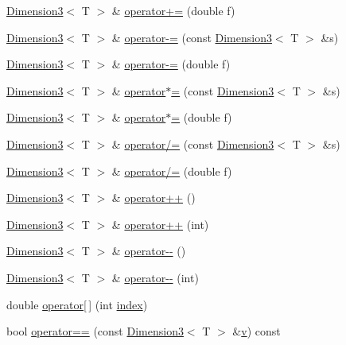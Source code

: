 \begin{DoxyCompactItemize}
\item 
\hyperlink{class_dimension3}{Dimension3}$<$ T $>$ \& \hyperlink{class_dimension3_a739511afcf01196a06af2e18e185de36}{operator+=} (double f)
\item 
\hyperlink{class_dimension3}{Dimension3}$<$ T $>$ \& \hyperlink{class_dimension3_a59ba7e3b967e47bb0ceb09fd3a00ceef}{operator-\/=} (const \hyperlink{class_dimension3}{Dimension3}$<$ T $>$ \&s)
\item 
\hyperlink{class_dimension3}{Dimension3}$<$ T $>$ \& \hyperlink{class_dimension3_a2e2616de0858e7e77fcc99766768cd37}{operator-\/=} (double f)
\item 
\hyperlink{class_dimension3}{Dimension3}$<$ T $>$ \& \hyperlink{class_dimension3_a68038737967d5f020285f01d2ddf342e}{operator$\ast$=} (const \hyperlink{class_dimension3}{Dimension3}$<$ T $>$ \&s)
\item 
\hyperlink{class_dimension3}{Dimension3}$<$ T $>$ \& \hyperlink{class_dimension3_ace804d72191f71ec6b3b37e32d80d008}{operator$\ast$=} (double f)
\item 
\hyperlink{class_dimension3}{Dimension3}$<$ T $>$ \& \hyperlink{class_dimension3_a28bcacfa40976f22f601702304e8ebf4}{operator/=} (const \hyperlink{class_dimension3}{Dimension3}$<$ T $>$ \&s)
\item 
\hyperlink{class_dimension3}{Dimension3}$<$ T $>$ \& \hyperlink{class_dimension3_aefb615bed65e96656c52702ad8f0e945}{operator/=} (double f)
\item 
\hyperlink{class_dimension3}{Dimension3}$<$ T $>$ \& \hyperlink{class_dimension3_a02ad43979fb26fae73a7dffc42bea594}{operator++} ()
\item 
\hyperlink{class_dimension3}{Dimension3}$<$ T $>$ \& \hyperlink{class_dimension3_a9aee60cee88efc67cf18b1113f46b582}{operator++} (int)
\item 
\hyperlink{class_dimension3}{Dimension3}$<$ T $>$ \& \hyperlink{class_dimension3_a1e770436df94c5c667a5a18275f05c48}{operator-\/-\/} ()
\item 
\hyperlink{class_dimension3}{Dimension3}$<$ T $>$ \& \hyperlink{class_dimension3_a78cfa7c1977b12449ea980a9dd4a3aa8}{operator-\/-\/} (int)
\item 
double \hyperlink{class_dimension3_a7194ed21197acb0270ead3179f9628da}{operator\mbox{[}$\,$\mbox{]}} (int \hyperlink{gl3_8h_a57f14e05b1900f16a2da82ade47d0c6d}{index})
\item 
bool \hyperlink{class_dimension3_a237ee21f15304bfb17b2aa7fa9b19c1f}{operator==} (const \hyperlink{class_dimension3}{Dimension3}$<$ T $>$ \&\hyperlink{gl3_8h_a14cfbe2fc2234f5504618905b69d1e06}{v}) const 
\end{DoxyCompactItemize}
